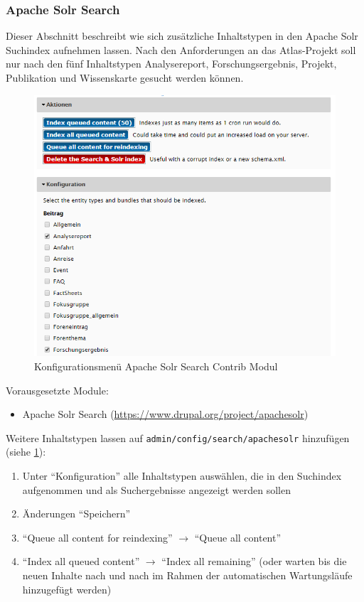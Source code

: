 \subsubsection{Apache Solr Search}\label{subsub:apachesolr}
Dieser Abschnitt beschreibt wie sich zusätzliche Inhaltstypen in den Apache Solr Suchindex aufnehmen lassen. Nach den Anforderungen an das Atlas-Projekt soll nur nach den fünf Inhaltstypen Analysereport, Forschungsergebnis, Projekt, Publikation und Wissenskarte gesucht werden können. 

\begin{figure}[H]
	\centering
	\includegraphics[height=0.20\textheight]{images/config_apachesolr}
	\caption{Konfigurationsmenü Apache Solr Search Contrib Modul}
	\label{fig:config_apachesolr}
\end{figure}

Vorausgesetzte Module:
\begin{itemize}
	\item Apache Solr Search (\url{https://www.drupal.org/project/apachesolr})
\end{itemize}

Weitere Inhaltstypen lassen auf \lstinline|admin/config/search/apachesolr| hinzufügen (siehe \cref{fig:config_apachesolr}):
\begin{enumerate}
	\item Unter \enquote{Konfiguration} alle Inhaltstypen auswählen, die in den Suchindex aufgenommen und als Suchergebnisse angezeigt werden sollen
	\item Änderungen \enquote{Speichern}
	\item \enquote{Queue all content for reindexing} $\rightarrow$ \enquote{Queue all content}
	\item \enquote{Index all queued content} $\rightarrow$ \enquote{Index all remaining} (oder warten bis die neuen Inhalte nach und nach im Rahmen der automatischen Wartungsläufe hinzugefügt werden)
\end{enumerate}



